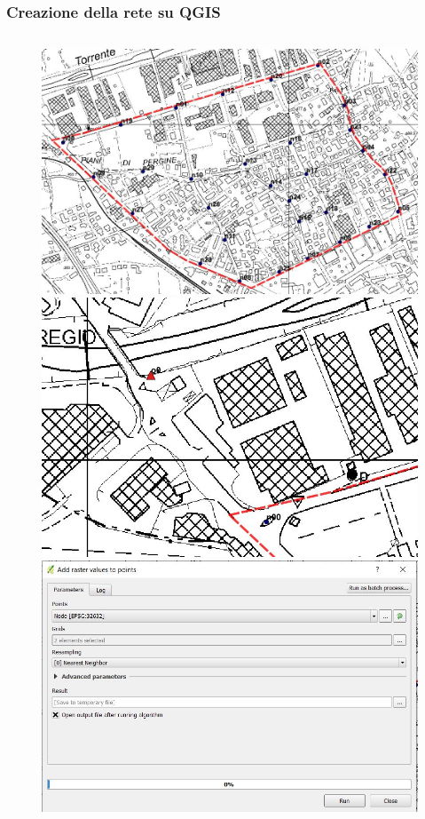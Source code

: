 \documentclass{beamer}
\begin{document}
\begin{frame}
 \frametitle{Creazione della rete su QGIS}
 
 \begin{columns}
  \begin{column}{.5\textwidth}
   \begin{figure}
    \centering  
    \begin{overprint}
     \includegraphics[width=\linewidth]{images/junctions}
     \includegraphics[width=\linewidth]{images/outfall}
     \includegraphics[width=\linewidth]{images/calcolo_quote_nodi}

\end{overprint}
\end{figure}
\end{column}
\end{columns}
\end{frame}
\end{document}
